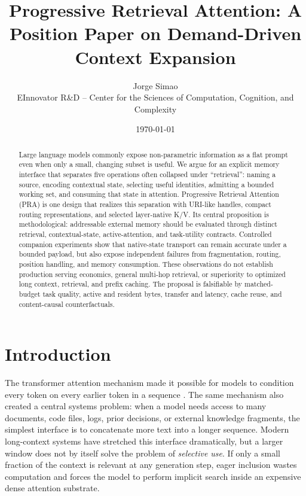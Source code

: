 \documentclass[11pt]{article}
\title{Progressive Retrieval Attention: A Position Paper on Demand-Driven Context Expansion}
\author{Jorge Simao\\EInnovator R\&D -- Center for the Sciences of Computation, Cognition, and Complexity}
\date{\today}
\begin{document}
\maketitle

\begin{abstract}
Large language models commonly expose non-parametric information as a flat prompt even
when only a small, changing subset is useful. We argue for an explicit memory interface
that separates five operations often collapsed under ``retrieval'': naming a source,
encoding contextual state, selecting useful identities, admitting a bounded working set,
and consuming that state in attention. Progressive Retrieval Attention (PRA) is one design
that realizes this separation with URI-like handles, compact routing representations, and
selected layer-native K/V. Its central proposition is methodological: addressable external
memory should be evaluated through distinct retrieval, contextual-state, active-attention,
and task-utility contracts. Controlled companion experiments show that native-state
transport can remain accurate under a bounded payload, but also expose independent failures
from fragmentation, routing, position handling, and memory consumption. These observations
do not establish production serving economics, general multi-hop retrieval, or superiority
to optimized long context, retrieval, and prefix caching. The proposal is falsifiable by
matched-budget task quality, active and resident bytes, transfer and latency, cache reuse,
and content-causal counterfactuals.
\end{abstract}

\section{Introduction}

The transformer attention mechanism made it possible for models to condition every token on every earlier token in a sequence \cite{vaswani2017attention}. The same mechanism also created a central systems problem: when a model needs access to many documents, code files, logs, prior decisions, or external knowledge fragments, the simplest interface is to concatenate more text into a longer sequence. Modern long-context systems have stretched this interface dramatically, but a larger window does not by itself solve the problem of \emph{selective use}. If only a small fraction of the context is relevant at any generation step, eager inclusion wastes computation and forces the model to perform implicit search inside an expensive dense attention substrate.
\end{document}
